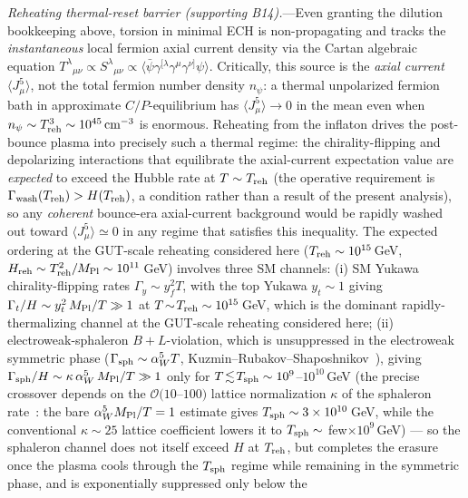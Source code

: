 \documentclass[aps,prd,twocolumn,superscriptaddress,showpacs,preprintnumbers,nofootinbib,longbibliography,floatfix]{revtex4-2}
\begin{document}
\textit{Reheating thermal-reset barrier (supporting B14).}---Even
granting the dilution bookkeeping above, torsion in minimal ECH is
non-propagating and tracks the \emph{instantaneous} local fermion axial
current density via the Cartan algebraic equation
$T^\lambda{}_{\mu\nu}\propto S^\lambda{}_{\mu\nu}\propto
\langle\bar\psi\gamma^{[\lambda}\gamma^\mu\gamma^{\nu]}\psi\rangle$.
Critically, this source is the \emph{axial current} $\langle J^5_\mu\rangle$,
not the total fermion number density $n_\psi$: a thermal unpolarized
fermion bath in approximate $C/P$-equilibrium has $\langle J^5_\mu\rangle
\to 0$ in the mean even when $n_\psi\sim T_{\rm reh}^3\sim 10^{45}\,
\text{cm}^{-3}$ is enormous. Reheating from the inflaton drives the
post-bounce plasma into precisely such a thermal regime: the
chirality-flipping and depolarizing interactions that equilibrate the
axial-current expectation value
are \emph{expected} to exceed the Hubble rate at $T\sim T_{\rm reh}$
(the operative requirement is $\Gamma_{\rm wash}(T_{\rm reh}) > H(T_{\rm reh})$,
a condition rather than a result of the present analysis), so any
\emph{coherent} bounce-era axial-current background would be
rapidly washed out toward $\langle J^5_\mu\rangle\simeq 0$ in any
regime that satisfies this inequality. The expected ordering at the
GUT-scale reheating considered here ($T_{\rm reh}\sim 10^{15}\,$GeV,
$H_{\rm reh}\sim T_{\rm reh}^2/M_{\rm Pl}\sim 10^{11}\,$GeV) involves
three SM channels: (i) SM Yukawa chirality-flipping rates
$\Gamma_y\sim y_f^2 T$, with the top Yukawa $y_t\sim 1$ giving
$\Gamma_t/H\sim y_t^2\,M_{\rm Pl}/T\gg 1$ at $T\!\sim\!T_{\rm reh}\sim
10^{15}\,$GeV, which is the dominant rapidly-thermalizing channel at
the GUT-scale reheating considered here;
(ii) electroweak-sphaleron $B\!+\!L$-violation, which is
unsuppressed in the electroweak symmetric phase
($\Gamma_{\rm sph}\sim\alpha_W^5 T$, Kuzmin--Rubakov--Shaposhnikov~\cite{Kuzmin1985}),
giving $\Gamma_{\rm sph}/H\sim\kappa\,\alpha_W^5\,M_{\rm Pl}/T\gg 1$ only
for $T\!\lesssim\!T_{\rm sph}\sim 10^{9}$--$10^{10}\,$GeV (the precise crossover
depends on the $\mathcal{O}(10$--$100)$ lattice normalization $\kappa$ of the
sphaleron rate~\cite{Kuzmin1985}: the bare $\alpha_W^5 M_{\rm Pl}/T=1$ estimate
gives $T_{\rm sph}\sim 3\times 10^{10}\,$GeV, while the conventional
$\kappa\!\sim\!25$ lattice coefficient lowers it to $T_{\rm sph}\sim$ few$\times
10^{9}\,$GeV) --- so the sphaleron channel does not
itself exceed $H$ at $T_{\rm reh}$, but completes the erasure once the
plasma cools through the $T_{\rm sph}$ regime while remaining in
the symmetric phase, and is exponentially suppressed only below the
\end{document}
